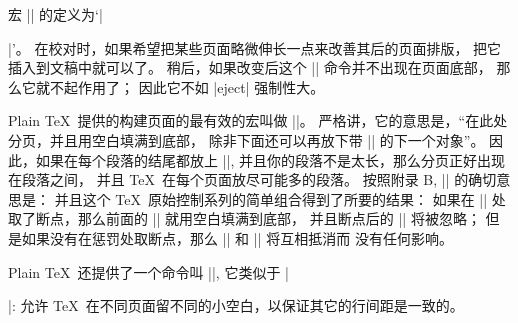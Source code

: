 \danger 宏 |\goodbreak| 的定义为`|\par{}|'。%
在校对时，如果希望把某些页面略微伸长一点来改善其后的页面排版，
把它插入到文稿中就可以了。%
稍后，如果改变后这个 |\goodbreak| 命令并不出现在页面底部，
那么它就不起作用了；
因此它不如 |eject| 强制性大。

\danger Plain \TeX\ 提供的构建页面的最有效的宏叫做 |\filbreak|。%
严格讲，它的意思是，``在此处分页，并且用空白填满到底部，
除非下面还可以再放下带 |\filbreak| 的下一个对象''。%
因此，如果在每个段落的结尾都放上 |\filbreak|,
并且你的段落不是太长，那么分页正好出现在段落之间，
并且 \TeX\ 在每个页面放尽可能多的段落。%
按照附录 B, |\filbreak| 的确切意思是：
\begintt
\vfil{}\vfilneg
\endtt
并且这个 \TeX\ 原始控制系列的简单组合得到了所要的结果：
如果在 || 处取了断点，那么前面的 |\vfil| 就用空白填满到底部，
并且断点后的 |\vfilneg| 将被忽略；
但是如果没有在惩罚处取断点，那么 |\vfil| 和 |\vfilneg| 将互相抵消而%
没有任何影响。

\danger Plain \TeX\ 还提供了一个命令叫 |\raggedbottom|,
它类似于 |\raggedright|:
允许 \TeX\ 在不同页面留不同的小空白，以保证其它的行间距是一致的。

